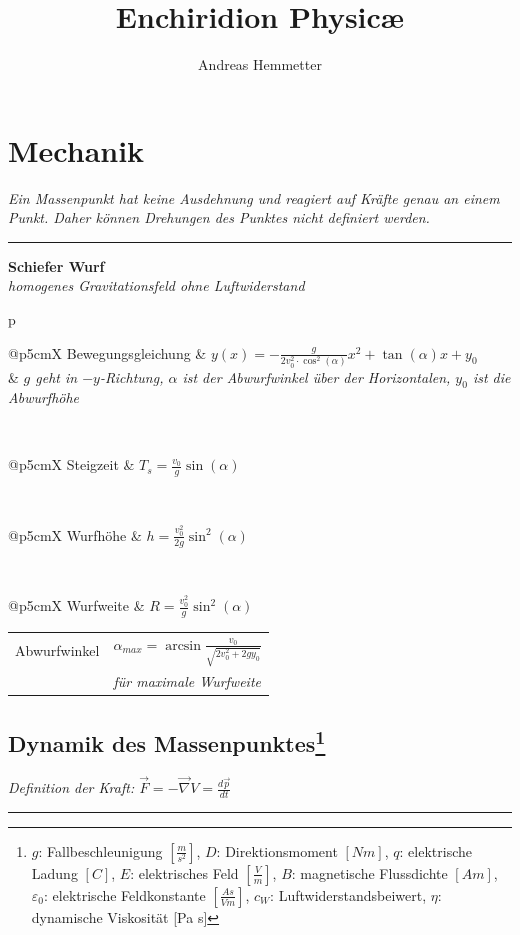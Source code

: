 \documentclass[12pt,a4paper, twoside]{article}
\title{Enchiridion Physic\ae}
\author{Andreas Hemmetter}
\makeatletter
\renewcommand{\d}[2]{\frac{d #1}{d #2}}
\renewcommand{\=}[1]{\stackrel{#1}{=}}
\theoremstyle{definition}
\theoremstyle{remark}
\newcommand{\notes}[1]{%
\textit{#1}\\
\hrule
}
\newcommand{\conceptcon}[3]{%
\noindent
\begin{framed}
\noindent\textbf{#1} \\
\textit{#2}
\par\begin{tabular}{p{\linewidth}}
#3
\end{tabular}
\end{framed}
}
\newcommand{\fnote}[3]{%
\noindent\begin{tabularx}{\linewidth}{@{}p{5cm}X}
#1 & $#2$\\
& \textit{\small{#3}}
\end{tabularx}}
\newcommand{\f}[2]{%
\noindent\begin{tabularx}{\linewidth}{@{}p{5cm}X}
#1 & $#2$
\end{tabularx}}
\makeatother
\begin{document}
\maketitle
\thispagestyle{empty}
\newpage

\begin{multicols}{2}
\tableofcontents
\end{multicols}


\newpage
{}





\section{Mechanik}

\notes{Ein Massenpunkt hat keine Ausdehnung und reagiert auf Kräfte genau an einem Punkt. Daher können Drehungen des Punktes nicht definiert werden.}

\conceptcon{Schiefer Wurf}{homogenes Gravitationsfeld ohne Luftwiderstand}{
\fnote{Bewegungsgleichung}{y(x) = - \frac{g}{2 v_0^2 \cdot \cos^2(\alpha)} x^2 + \tan(\alpha) x + y_0}{$g$ geht in $-y$-Richtung, $\alpha$ ist der Abwurfwinkel über der Horizontalen, $y_0$ ist die Abwurfhöhe}\\
\f{Steigzeit}{T_s = \frac{v_0}{g} \sin(\alpha)}\\
\f{Wurfhöhe}{h = \frac{v_0^2}{2g} \sin^2(\alpha)}\\
\f{Wurfweite}{R = \frac{v_0^2}{g} \sin^2(\alpha)}
\fnote{Abwurfwinkel}{\alpha_{max} = \arcsin \frac{v_0}{\sqrt{2 v_0^2 + 2 g y_0}}}{für maximale Wurfweite}
}


\newpage
\subsection[Dynamik des Massenpunktes]{Dynamik des Massenpunktes\let\thefootnote\relax\footnote{$g$: Fallbeschleunigung $[\frac{m}{s^2}]$, $D$: Direktionsmoment $[Nm]$, $q$: elektrische Ladung $[C]$, $E$: elektrisches Feld $[\frac{V}{m}]$, $B$: magnetische Flussdichte $[Am]$, $\varepsilon_0$: elektrische Feldkonstante $[\frac{As}{Vm}]$, $c_W$: Luftwiderstandsbeiwert, $\eta$: dynamische Viskosität [Pa s]}}

\notes{Definition der Kraft: $\vec{F} = -\vec{\nabla}V = \d{\vec p}{t}$}
\end{document}
